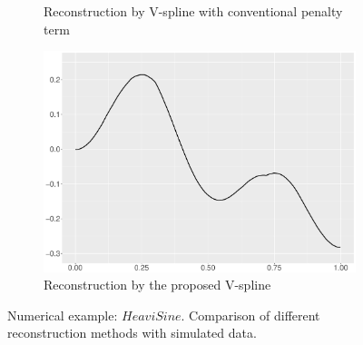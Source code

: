 \begin{figure}
\begin{subfigure}{0.45\textwidth}
    \caption{Reconstruction by V-spline with conventional penalty term }
    \end{subfigure}
    \begin{subfigure}{0.45\textwidth}
    \centering
    \includegraphics[width=\linewidth,height=0.45\textwidth]{Chapters/02TractorSplineTheory/plot/ggplot/ggHeaviSineTractor.pdf}
    \caption{Reconstruction by the proposed V-spline }
    \end{subfigure}
\caption{Numerical example: $\textit{HeaviSine}$. Comparison of different reconstruction methods with simulated data.}\label{num3}
 \end{figure}

